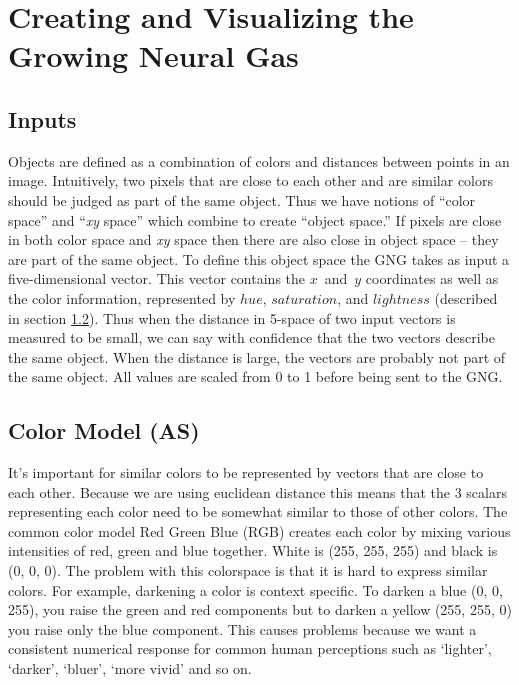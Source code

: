 \documentclass{article}
\renewcommand{\|}{\origbar} %
\newcommand{\xyspace}{{\em xy} space}
\begin{document}
\section{Creating and Visualizing the Growing Neural Gas}
\label{sec:creatingGNG}

\subsection{Inputs}


Objects are defined as a combination of colors and distances between points in an image. Intuitively, two pixels that are close to each other and are similar colors should be judged as part of the same object. Thus we have notions of ``color space'' and ``\xyspace'' which combine to create ``object space.'' If pixels are close in both color space and \xyspace{} then there are also close in object space -- they are part of the same object. To define this object space the GNG takes as input a five-dimensional vector. This vector contains the $x$~and~$y$ coordinates as well as the color information, represented by $hue$, $saturation$, and $lightness$ (described in section \ref{sec:colorModel}). Thus when the distance in 5-space of two input vectors is measured to be small, we can say with confidence that the two vectors describe the same object. When the distance is large, the vectors are probably not part of the same object. All values are scaled from 0 to 1 before being sent to the GNG.

\subsection{Color Model (AS)}
\label{sec:colorModel}

It's important for similar colors to be represented by vectors that are close to each other. Because we are using euclidean distance this means that the 3 scalars representing each color need to be somewhat similar to those of other colors. The common color model Red Green Blue (RGB) creates each color by mixing various intensities of red, green and blue together. White is (255, 255, 255) and black is (0, 0, 0). The problem with this colorspace is that it is hard to express similar colors. For example, darkening a color is context specific. To darken a blue (0, 0, 255), you raise the green and red components but to darken a yellow (255, 255, 0) you raise only the blue component. This causes problems because we want a consistent numerical response for common human perceptions such as `lighter', `darker', `bluer', `more vivid' and so on.
\end{document}

